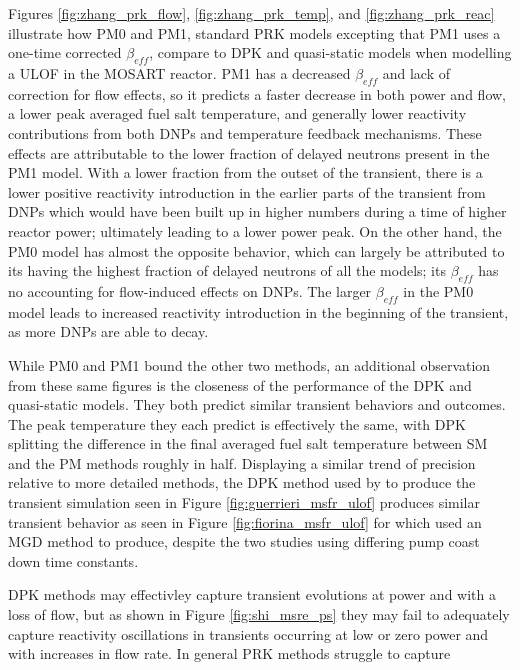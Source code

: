\documentclass[review]{elsarticle}
\begin{document}
\par Figures
\ref{fig:zhang_prk_flow}, \ref{fig:zhang_prk_temp}, and 
\ref{fig:zhang_prk_reac} illustrate how PM0 and PM1,
standard PRK models excepting that PM1 uses a one-time corrected $\beta_{eff}$,
compare to DPK and quasi-static models when modelling a ULOF in
the MOSART reactor. PM1 has a decreased $\beta_{eff}$ and lack of correction
for flow effects, so it predicts a faster decrease in both power
    and flow, a lower
peak averaged fuel salt temperature, and generally lower reactivity
contributions from both DNPs and temperature feedback mechanisms. These
effects are attributable to the lower fraction of delayed neutrons present
in the PM1 model. With a lower fraction from the outset of the transient, there
is a lower positive reactivity introduction in the earlier parts of the
transient from DNPs which would have been built up in higher numbers during
a time of higher reactor power; ultimately leading to a lower power peak.
On the other hand, the PM0 model has almost
the opposite behavior, which can largely be attributed to its having the
highest fraction of delayed neutrons of all the models; its $\beta_{eff}$
has no accounting for flow-induced effects on DNPs. The larger
$\beta_{eff}$ in the PM0 model leads to increased reactivity introduction
in the beginning of the transient, as more DNPs are able to decay.
\par While PM0 and PM1 bound the other two methods, an additional observation
 from
these same figures is the closeness of the performance of the DPK and
quasi-static models. They both predict similar transient
behaviors and outcomes. The peak temperature they each predict is effectively
the same, with DPK splitting the difference in the final averaged fuel salt
temperature between SM and the PM methods roughly in half. Displaying
a similar trend of precision relative to more detailed methods, the DPK method
 used by \cite{guerrieri_investigation_2013} to produce
the transient simulation seen in Figure \ref{fig:guerrieri_msfr_ulof}
produces similar transient
behavior as seen in Figure \ref{fig:fiorina_msfr_ulof} for which
\cite{fiorina_modelling_2014} used an MGD method to produce, despite the two
studies using differing pump coast down time constants.
\par DPK methods may effectivley capture transient evolutions at power and
 with a loss
of flow, but as shown in Figure \ref{fig:shi_msre_ps} they may fail to
adequately capture reactivity oscillations in transients occurring at low
or zero power
and with increases in flow rate. In general PRK methods struggle to capture
\end{document}
